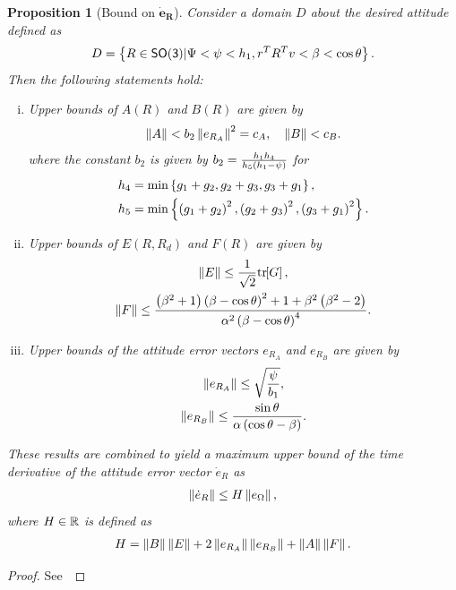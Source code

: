 \documentclass[10pt,fleqn]{IJCAS}  %
\newtheorem{prop}{Proposition}
\begin{document}
\begin{multicols}{2}
\begin{prop}[Bound on \( \bm{\dot{e}_R} \)]\label{prop:eR_dot_bound}
Consider a domain \( D \) about the desired attitude defined as
\begin{align}
	D = \left\{ R \in \mathsf{SO(3)} \vert \Psi < \psi < h_1, r^T R^T v < \beta < \cos \theta \right\}. \label{eqn:domain}
\end{align}
Then the following statements hold:
\begin{enumerate}[(i)]
	\item \label{item:prop_eR_dot_bound_AB} Upper bounds of \( A(R) \) and \( B(R) \) are given by
	\begin{gather}
		\left\| A \right\| < b_2 \left\| e_{R_A} \right\|^2 = c_A  , \quad \left\| B \right\| < c_B . \label{eqn:AB_bound}
	\end{gather}
  where the constant \( b_2\) is given by \( b_2 = \frac{h_1 h_4}{h_5 \left( h_1 - \psi \right)}\) for
  \begin{align*}
    h_4 &= \min\left\{ g_1 + g_2, g_2 + g_3 , g_3 + g_1 \right\} ,\\
    h_5 &= \min\left\{ \left( g_1 + g_2 \right)^2,\left( g_2 + g_3 \right)^2 , \left( g_3 + g_1 \right)^2 \right\} .\\
  \end{align*}
	\item \label{item:prop_eR_dot_bound_EF} Upper bounds of \( E(R,R_d) \) and \( F(R) \) are given by
	\begin{gather}
		\left\| E \right\| \leq \frac{1}{\sqrt{2}} \mathrm{tr}\negthickspace\left[ G \right]  , \label{eqn:E_bound} \\
		\left\| F \right\| \leq \frac{\left( \beta^2 + 1 \right)\left( \beta - \cos \theta \right)^2 + 1 + \beta^2 \left( \beta^2-2 \right)}{\alpha^2 \left( \beta-\cos \theta \right)^4} . \label{eqn:F_bound}
	\end{gather}
	\item Upper bounds of the attitude error vectors \( e_{R_A} \) and \( e_{R_B} \) are given by
	\begin{gather}
		\left\| e_{R_A} \right\| \leq \sqrt{\frac{\psi}{b_1}}, \label{eqn:eRA_bound} \\
		\left\| e_{R_B} \right\| \leq \frac{\sin\theta}{\alpha \left( \cos \theta - \beta \right)}. \label{eqn:eRB_bound}
	\end{gather}

\end{enumerate}
These results are combined to yield a maximum upper bound of the time derivative of the attitude error vector \( \dot{e}_R \) as
\begin{gather}
	\left\| \dot{e}_R \right\| \leq H \left\| e_\Omega \right\| ,\label{eqn:eR_bound}
\end{gather}
where  \( H \in \mathbb{R} \) is defined as
\begin{gather}
	H = \left\| B \right\| \left\| E \right\| + 2 \left\| e_{R_A} \right\| \left\| e_{R_B} \right\| + \left\| A \right\|\left\| F \right\|. \label{eqn:H}
\end{gather}
\end{prop}
\begin{proof}
See~
\end{proof}


\end{multicols}
\end{document}
